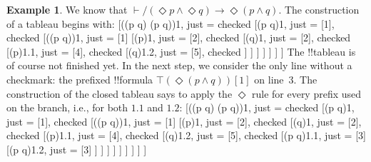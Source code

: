\documentclass[10pt,a4paper]{article}
\theoremstyle{plain}
\theoremstyle{definition}
\newtheorem{ex}[thm]{Example}
\theoremstyle{remark}
\newenvironment{oltableau}{}{}
\providecommand{\lif}{\mathbin{\rightarrow}}
\providecommand{\Proves}{\mathrel{\vdash}}
\providecommand{\sFmla}[2]{#1(#2)}
\providecommand{\pFmla}[2]{#1(#2)}
\providecommand{\True}{\top}
\providecommand{\False}{\bot}
\providecommand{\TAss}[1]{}
\providecommand{\TRule}[1]{}
\begin{document}
{
\begin{ex}
  We know that $\Proves/ (\Diamond p \land \Diamond q) \lif \Diamond(p
  \land q)$. The construction of a tableau begins with:
  \begin{oltableau}
    [\pFmla{\False}{(\Diamond p \land \Diamond q) \lif \Diamond(p \land q)}{1},
      just = \TAss, checked
      [\pFmla{\True}{\Diamond p \land \Diamond q}{1},
        just = {\TRule{\False}{\lif}[1]}, checked
        [\pFmla{\False}{\Diamond(p \land q)}{1},
          just = {\TRule{\False}{\lif}[1]}
          [\pFmla{\True}{\Diamond p}{1},
            just = {\TRule{\True}{\land}[2]}, checked
            [\pFmla{\True}{\Diamond q}{1},
              just = {\TRule{\True}{\land}[2]}, checked
              [\pFmla{\True}{p}{1.1}, 
                just = {\TRule{\True}{\Diamond}[4]}, checked
                [\pFmla{\True}{q}{1.2}, 
                  just = {\TRule{\True}{\Diamond}[5]}, checked
                ]
              ]
            ]
          ]
        ]
      ]
    ]
  \end{oltableau}
  The !!{tableau} is of course not finished yet. In the next step, we
  consider the only line without a checkmark: the prefixed !!{formula}
  $\sFmla{\True}{\Diamond(p \land q)}[1]$ on line~$3$. The construction of
  the closed tableau says to apply the $\TRule{\True}{\Diamond}$ rule for
  every prefix used on the branch, i.e., for both $1.1$ and $1.2$:
  \begin{oltableau}
    [\pFmla{\False}{\Diamond(p \land q) \lif (\Diamond p \land \Diamond q)}{1},
      just = \TAss, checked
      [\pFmla{\True}{\Diamond p \land \Diamond q}{1},
        just = {\TRule{\False}{\lif}[1]}, checked
        [\pFmla{\False}{\Diamond (p \land q)}{1},
          just = {\TRule{\False}{\lif}[1]}
          [\pFmla{\True}{\Diamond p}{1},
            just = {\TRule{\True}{\land}[2]}, checked
            [\pFmla{\True}{\Diamond q}{1},
              just = {\TRule{\True}{\land}[2]}, checked
              [\pFmla{\True}{p}{1.1}, 
                just = {\TRule{\True}{\Diamond}[4]}, checked
                [\pFmla{\True}{q}{1.2}, 
                  just = {\TRule{\True}{\Diamond}[5]}, checked
                  [\pFmla{\False}{p \land q}{1.1}, 
                    just = {\TRule{\False}{\Diamond}[3]}
                    [\pFmla{\False}{p \land q}{1.2}, 
                      just = {\TRule{\False}{\Diamond}[3]}
                    ]
                  ]
                ]
              ]
            ]
          ]
        ]
      ]
    ]
  \end{oltableau}

\end{ex}}
\end{document}
